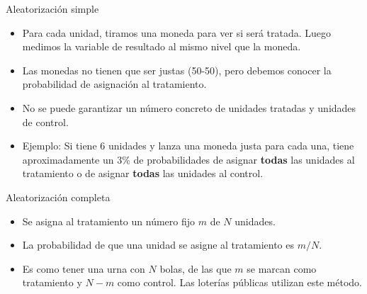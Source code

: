 \documentclass[
  ignorenonframetext,
]{beamer}
\begin{document}

\begin{frame}{Aleatorización simple}
\protect\hypertarget{aleatorizaciuxf3n-simple}{}
\begin{itemize}
\item
  Para cada unidad, tiramos una moneda para ver si será tratada. Luego
  medimos la variable de resultado al mismo nivel que la moneda.
\item
  Las monedas no tienen que ser justas (50-50), pero debemos conocer la
  probabilidad de asignación al tratamiento.
\item
  No se puede garantizar un número concreto de unidades tratadas y
  unidades de control.
\item
  Ejemplo: Si tiene 6 unidades y lanza una moneda justa para cada una,
  tiene aproximadamente un 3\% de probabilidades de asignar
  \textbf{todas} las unidades al tratamiento o de asignar \textbf{todas}
  las unidades al control.
\end{itemize}
\end{frame}

\begin{frame}{Aleatorización completa}
\protect\hypertarget{aleatorizaciuxf3n-completa}{}
\begin{itemize}
\item
  Se asigna al tratamiento un número fijo \(m\) de \(N\) unidades.
\item
  La probabilidad de que una unidad se asigne al tratamiento es \(m/N\).
\item
  Es como tener una urna con \(N\) bolas, de las que \(m\) se marcan
  como tratamiento y \(N-m\) como control. Las loterías públicas
  utilizan este método.
\end{itemize}
\end{frame}
\end{document}
